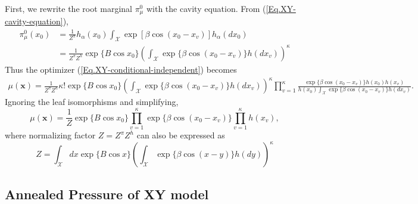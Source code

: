 \documentclass[12pt]{article}
\numberwithin{equation}{section}
\begin{document}
First, we rewrite the root marginal $\pi_\mu^0$ with the cavity equation.
From (\ref{Eq.XY-cavity-equation}),
\begin{align*}
    \pi_\mu^0(x_0) & = \frac1{Z^\pi}h_\alpha(x_0)\int_{\mathcal{X}}\exp[\beta\cos(x_0-x_v)]h_\alpha(dx_0)                         \\
                   & = \frac1{Z^\pi Z^h} \exp\{B\cos x_0\}\left(\int_{\mathcal{X}}\exp\{\beta\cos(x_0-x_v)\}h(dx_v)\right)^\kappa
\end{align*}
Thus the optimizer (\ref{Eq.XY-conditional-independent}) becomes
\begin{align*}
    \mu(\mathbf{x}) = \frac1{Z^\pi Z^h} \kappa! \exp\{B\cos x_0\}\left(\int_{\mathcal{X}}\exp\{\beta\cos(x_0-x_v)\}h(dx_v)\right)^\kappa \prod_{v=1}^\kappa \frac{\exp\{\beta\cos(x_0-x_v)\}h(x_0)h(x_v)}{h(x_0)\int_{\mathcal{X}}\exp\{\beta\cos(x_0-x_v)\}h(dx_v)}.
\end{align*}
Ignoring the leaf isomorphisms and simplifying,
\begin{equation}
    \label{Eq.XY-optimizer}
    \mu(\mathbf{x}) = \frac1Z \exp\{B\cos x_0\} \prod_{v=1}^\kappa \exp\{\beta\cos(x_0-x_v)\}\prod_{v=1}^\kappa h(x_v),
\end{equation}
where normalizing factor $Z=Z^\pi Z^h$ can also be expressed as
\begin{equation}
    \label{Eq.XY-Z}
    Z = \int_{\mathcal{X}} dx \exp\{B\cos x\} \left(\int_\mathcal{X}\exp\{\beta\cos(x-y)\}h(dy)\right)^\kappa
\end{equation}

\subsection{Annealed Pressure of XY model}
\end{document}
